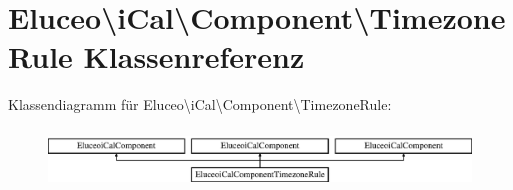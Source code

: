 \hypertarget{class_eluceo_1_1i_cal_1_1_component_1_1_timezone_rule}{}\section{Eluceo\textbackslash{}i\+Cal\textbackslash{}Component\textbackslash{}Timezone\+Rule Klassenreferenz}
\label{class_eluceo_1_1i_cal_1_1_component_1_1_timezone_rule}
Klassendiagramm für Eluceo\textbackslash{}i\+Cal\textbackslash{}Component\textbackslash{}Timezone\+Rule\+:\begin{figure}[H]
\begin{center}
\leavevmode
\includegraphics[height=1.595442cm]{class_eluceo_1_1i_cal_1_1_component_1_1_timezone_rule}
\end{center}
\end{figure}
